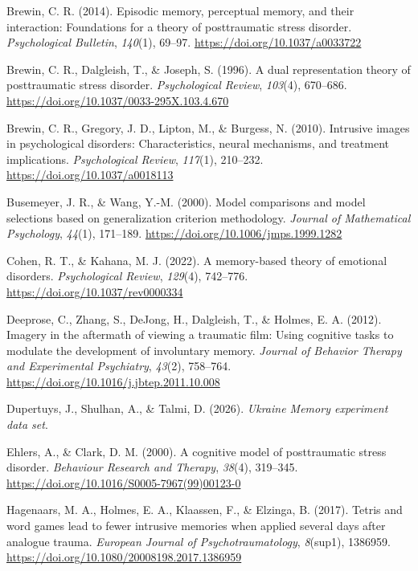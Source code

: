 \documentclass[
  man,
  floatsintext,
  longtable,
  nolmodern,
  notxfonts,
  notimes,
  draftfirst,
  colorlinks=true,linkcolor=blue,citecolor=blue,urlcolor=blue]{apa7}
\newlength{\cslhangindent}
\newenvironment{CSLReferences}[2] %
 {\begin{list}{}{%
  \setlength{\itemindent}{0pt}
  \setlength{\leftmargin}{0pt}
  \setlength{\parsep}{0pt}
  \ifodd #1
   \setlength{\leftmargin}{\cslhangindent}
   \setlength{\itemindent}{-1\cslhangindent}
  \fi
  \setlength{\itemsep}{#2\baselineskip}}}
 {\end{list}}
\begin{document}
\begin{CSLReferences}{1}{0}
Brewin, C. R. (2014). Episodic memory, perceptual memory, and their
interaction: Foundations for a theory of posttraumatic stress disorder.
\emph{Psychological Bulletin}, \emph{140}(1), 69--97.
\url{https://doi.org/10.1037/a0033722}

Brewin, C. R., Dalgleish, T., \& Joseph, S. (1996). A dual
representation theory of posttraumatic stress disorder.
\emph{Psychological Review}, \emph{103}(4), 670--686.
\url{https://doi.org/10.1037/0033-295X.103.4.670}

Brewin, C. R., Gregory, J. D., Lipton, M., \& Burgess, N. (2010).
Intrusive images in psychological disorders: Characteristics, neural
mechanisms, and treatment implications. \emph{Psychological Review},
\emph{117}(1), 210--232. \url{https://doi.org/10.1037/a0018113}

Busemeyer, J. R., \& Wang, Y.-M. (2000). Model comparisons and model
selections based on generalization criterion methodology. \emph{Journal
of Mathematical Psychology}, \emph{44}(1), 171--189.
\url{https://doi.org/10.1006/jmps.1999.1282}

Cohen, R. T., \& Kahana, M. J. (2022). A memory-based theory of
emotional disorders. \emph{Psychological Review}, \emph{129}(4),
742--776. \url{https://doi.org/10.1037/rev0000334}

Deeprose, C., Zhang, S., DeJong, H., Dalgleish, T., \& Holmes, E. A.
(2012). Imagery in the aftermath of viewing a traumatic film: Using
cognitive tasks to modulate the development of involuntary memory.
\emph{Journal of Behavior Therapy and Experimental Psychiatry},
\emph{43}(2), 758--764.
\url{https://doi.org/10.1016/j.jbtep.2011.10.008}

Dupertuys, J., Shulhan, A., \& Talmi, D. (2026). \emph{{Ukraine Memory}
experiment data set}.

Ehlers, A., \& Clark, D. M. (2000). A cognitive model of posttraumatic
stress disorder. \emph{Behaviour Research and Therapy}, \emph{38}(4),
319--345. \url{https://doi.org/10.1016/S0005-7967(99)00123-0}

Hagenaars, M. A., Holmes, E. A., Klaassen, F., \& Elzinga, B. (2017).
{Tetris} and word games lead to fewer intrusive memories when applied
several days after analogue trauma. \emph{European Journal of
Psychotraumatology}, \emph{8}(sup1), 1386959.
\url{https://doi.org/10.1080/20008198.2017.1386959}


\end{CSLReferences}
\end{document}

